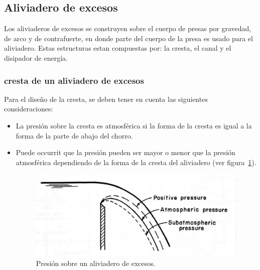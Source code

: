 \documentclass[11pt, oneside]{article}
\begin{document}
\subsection{Aliviadero de excesos}
Los aliviaderos de excesos se construyen sobre el cuerpo de presas por gravedad, de arco y de contrafuerte, en donde parte del cuerpo de la presa es usado para el aliviadero. Estas estructuras estan compuestas por: la cresta, el canal y el disipador de energ\'ia. 

\subsubsection{cresta de un aliviadero de excesos}
Para el diseño de la cresta, se deben tener en cuenta las siguientes consideraciones:
\begin{itemize}
    \item La presi\'on sobre la cresta es atmosf\'erica si la forma de la cresta es igual a la forma de la parte de abajo del chorro.
    \item Puede occurrit que la presi\'on pueden ser mayor o menor que la presi\'on atmosf\'erica dependiendo de la forma de la cresta del aliviadero (ver figura~\ref{fig717}).
\begin{figure}[h]
    \centering
    \includegraphics[width=0.8\linewidth]{fig717.jpeg}
    \caption{Presi\'on sobre un aliviadero de excesos.}
    \label{fig717}
\end{figure}


\end{itemize}
\end{document}
